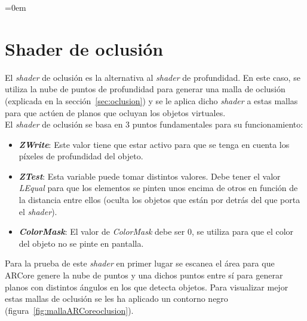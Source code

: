 \parindent=0em
\section{Shader de oclusión}
\label{shaderOclusionSec}
\noindent


El \textit{shader} de oclusión es la alternativa al \textit{shader} de profundidad. En este caso, se utiliza la nube de puntos de profundidad para generar una malla de oclusión (explicada en la sección~\ref{sec:oclusion}) y se le aplica dicho \textit{shader} a estas mallas para que actúen de planos que ocluyan los objetos virtuales.\\

El \textit{shader} de oclusión se basa en 3 puntos fundamentales para su funcionamiento:

\begin{itemize}
    \item \textit{\textbf{ZWrite}}: Este valor tiene que estar activo para que se tenga en cuenta los píxeles de profundidad del objeto. 
    
    \item \textit{\textbf{ZTest}}: Esta variable puede tomar distintos valores. Debe tener el valor \textit{LEqual} para que los elementos se pinten unos encima de otros en función de la distancia entre ellos (oculta los objetos que están por detrás del que porta el \textit{shader}).

    \item \textit{\textbf{ColorMask}}: El valor de \textit{ColorMask} debe ser 0, se utiliza para que el color del objeto no se pinte en pantalla.
\end{itemize}

Para la prueba de este \textit{shader} en primer lugar se escanea el área para que ARCore genere la nube de puntos y una dichos puntos entre sí para generar planos con distintos ángulos en los que detecta objetos. Para visualizar mejor estas mallas de oclusión se les ha aplicado un contorno negro (figura~\ref{fig:mallaARCoreoclusion}).

